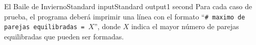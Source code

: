 \begin{problem}{El Baile de Invierno}{Standard input}{Standard output}{1 second}{}
\OutputFile
Para cada caso de prueba, el programa deber\'a imprimir una línea con el formato ``\texttt{\# maximo de parejas equilibradas = $X$}'', donde $X$ indica el mayor número de parejas equilibradas que pueden ser formadas.

\Example

\begin{example}
\end{example}

\end{problem}
